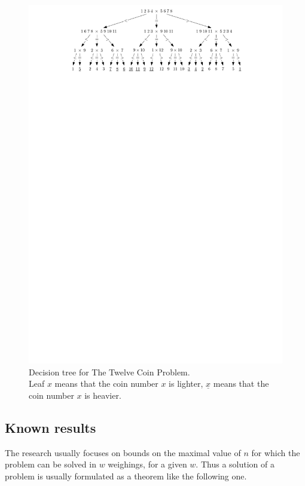 \begin{figure}[ht]
\includegraphics[width=\textwidth]{pictures/coins12.pdf}
\caption{Decision tree for The Twelve Coin Problem. \\
Leaf $x$ means that the coin number $x$ is lighter, $\underline{x}$ means that
the coin number $x$ is heavier.}
\label{fig:coins12tree}
\end{figure}

\subsection{Known results}

The research usually focuses on bounds on the maximal value of $n$
  for which the problem can be solved in $w$ weighings, for a given $w$.
Thus a solution of a problem is usually formulated as a theorem like the
  following one.

